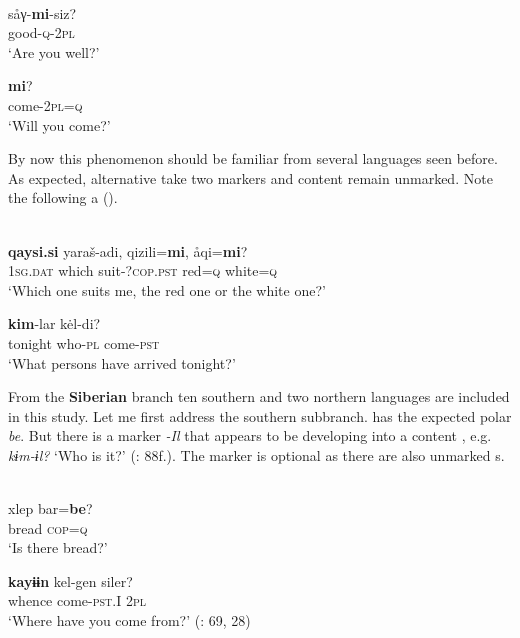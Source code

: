 \ea%
    \label{ex:turk:41}
    \\
    \ea
    \gll såγ-\textbf{{mi}}{-siz?}\\
    good-\textsc{q}-2\textsc{pl}\\
    \glt ‘Are you well?’
    
    \ex
    \textbf{{mi}}?\\
    come-2\textsc{pl}=\textsc{q}\\
    \glt ‘Will you come?’ \citep[373]{Boeschoten1998}
    \z
    \z

By now this phenomenon should be familiar from several languages seen before. As expected, alternative  take two markers and content  remain unmarked. Note the  following a  ().

\ea%
    \label{ex:turk:42}
    \\
    \ea
     \textbf{{qaysi.si}} yaraš-adi,  qizili=\textbf{{mi}},  åqi=\textbf{{mi}}?\\
    1\textsc{sg}.\textsc{dat}  which    suit-?\textsc{cop.pst}  red=\textsc{q}    white=\textsc{q}\\
    \glt ‘Which one suits me, the red one or the white one?’
    
    \ex
     \textbf{{kim}}-lar  k\.el-di?\\
    tonight    who-\textsc{pl}    come-\textsc{pst}\\
    \glt ‘What persons have arrived tonight?’ \citep[371]{Boeschoten1998}
    \z
    \z

From the \textbf{Siberian} branch ten southern and two northern languages are included in this study. Let me first address the southern subbranch. \textbf{} has the expected polar  \textit{be}. But there is a marker \textit{-Il} that appears to be developing into a content , e.g. \textit{kɨm-ɨl?} ‘Who is it?’ (\citealt{AndersonHarrison1999}: 88f.). The marker is optional as there are also unmarked s.

\ea%
    \label{ex:turk:43}
    \\
    \ea
    \gll xlep  bar=\textbf{{be}}?\\
    bread  \textsc{cop=q}\\
    \glt ‘Is there bread?’
    
    \ex
    \gll \textbf{{kayɨɨn}} kel-gen    siler?\\
    whence  come-\textsc{pst.I}  2\textsc{pl}\\
    \glt ‘Where have you come from?’ (\citealt{AndersonHarrison1999}: 69, 28)
    \z
    \z

